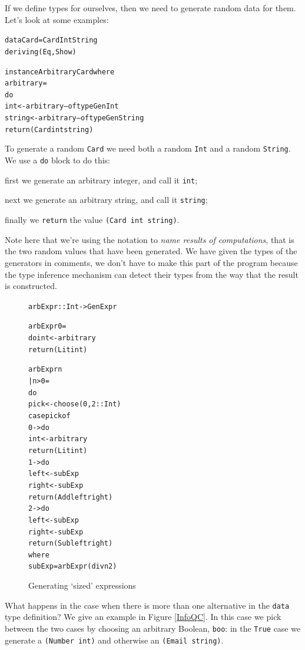 If we define types for ourselves, then we need to generate random data for them. Let's look at some examples:
\begin{alltt}
data Card = Card Int String
            deriving (Eq,Show)

instance Arbitrary Card where
    arbitrary =
        do
          int    <- arbitrary -- of type Gen Int
          string <- arbitrary -- of type Gen String
          return (Card int string)
\end{alltt}
To generate a random \texttt{Card} we need both a random \texttt{Int} and a random \texttt{String}. We use a \texttt{do} block to do this:
\begin{titemize}
\item
first we generate an arbitrary integer, and call it \texttt{int};
\item
next we generate an arbitrary string, and call it \texttt{string};
\item
finally we \texttt{return} the value \texttt{(Card int string)}.
\end{titemize}
Note here that we're using the notation to \emph{name results of computations}, that is the two random values that have been generated. We have given the types of the generators in comments, we don't have to make this part of the program because the type inference mechanism can detect their types from the way that the result is constructed.

\begin{figure}[t] 
\begin{center}
\begin{alltt}
arbExpr :: Int -> Gen Expr

arbExpr 0 = 
    do int <- arbitrary
       return (Lit int)

arbExpr n
    | n>0 =
        do
          pick <- choose (0,2::Int)
          case pick of
            0 -> do 
              int <- arbitrary
              return (Lit int)
            1 -> do 
              left  <- subExp
              right <- subExp
              return (Add left right)
            2 -> do 
              left  <- subExp
              right <- subExp
              return (Sub left right)
        where
          subExp = arbExpr (div n 2)
\end{alltt}
\end{center}
\caption{Generating `sized' expressions}
\label{arbExpr}
\end{figure}


What happens in the case when there is more than one alternative in the \texttt{data} type definition? We give an example in Figure \ref{InfoQC}.
In this case we pick between the two cases by choosing an arbitrary Boolean, \texttt{boo}: in the \texttt{True} case we generate a \texttt{(Number int)} and otherwise an \texttt{(Email string)}. 

